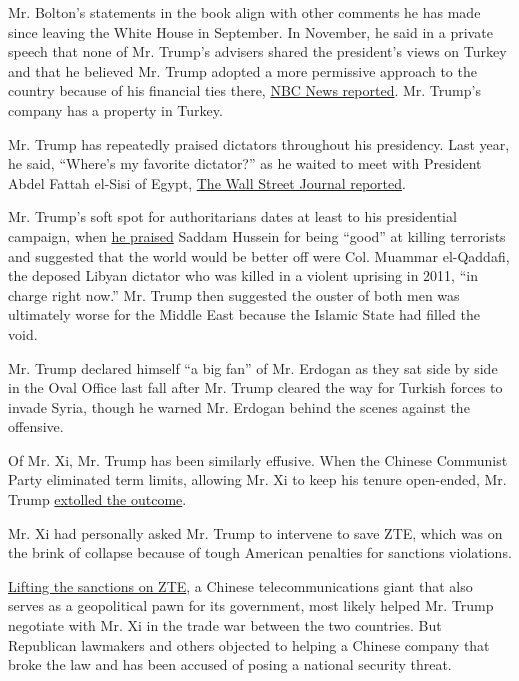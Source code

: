 Mr. Bolton's statements in the book align with other comments he has
made since leaving the White House in September. In November, he said in
a private speech that none of Mr. Trump's advisers shared the
president's views on Turkey and that he believed Mr. Trump adopted a
more permissive approach to the country because of his financial ties
there,
\href{https://www.nbcnews.com/politics/donald-trump/private-speech-bolton-suggests-some-trump-s-foreign-policy-decisions-n1080651}{NBC
News reported}. Mr. Trump's company has a property in Turkey.

Mr. Trump has repeatedly praised dictators throughout his presidency.
Last year, he said, ``Where's my favorite dictator?'' as he waited to
meet with President Abdel Fattah el-Sisi of Egypt,
\href{https://www.wsj.com/articles/trump-awaiting-egyptian-counterpart-at-summit-called-out-for-my-favorite-dictator-11568403645}{The
Wall Street Journal reported}.

Mr. Trump's soft spot for authoritarians dates at least to his
presidential campaign, when
\href{https://www.nytimes3xbfgragh.onion/2016/07/06/us/politics/donald-trump-saddam-hussein.html}{he
praised} Saddam Hussein for being ``good'' at killing terrorists and
suggested that the world would be better off were Col. Muammar
el-Qaddafi, the deposed Libyan dictator who was killed in a violent
uprising in 2011, ``in charge right now.'' Mr. Trump then suggested the
ouster of both men was ultimately worse for the Middle East because the
Islamic State had filled the void.

Mr. Trump declared himself ``a big fan'' of Mr. Erdogan as they sat side
by side in the Oval Office last fall after Mr. Trump cleared the way for
Turkish forces to invade Syria, though he warned Mr. Erdogan behind the
scenes against the offensive.

Of Mr. Xi, Mr. Trump has been similarly effusive. When the Chinese
Communist Party eliminated term limits, allowing Mr. Xi to keep his
tenure open-ended, Mr. Trump
\href{https://www.cnn.com/2018/03/03/politics/trump-maralago-remarks/index.html}{extolled
the outcome}.

Mr. Xi had personally asked Mr. Trump to intervene to save ZTE, which
was on the brink of collapse because of tough American penalties for
sanctions violations.

\href{https://www.nytimes3xbfgragh.onion/2018/06/07/business/us-china-zte-deal.html}{Lifting
the sanctions on ZTE}, a Chinese telecommunications giant that also
serves as a geopolitical pawn for its government, most likely helped Mr.
Trump negotiate with Mr. Xi in the trade war between the two countries.
But Republican lawmakers and others objected to helping a Chinese
company that broke the law and has been accused of posing a national
security threat.

